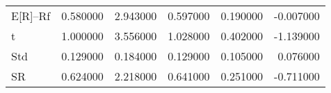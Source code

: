 \begin{tabular}{lrrrrr}
\toprule
\midrule
E[R]--Rf & 0.580000 & 2.943000 & 0.597000 & 0.190000 & -0.007000 \\
t & 1.000000 & 3.556000 & 1.028000 & 0.402000 & -1.139000 \\
Std & 0.129000 & 0.184000 & 0.129000 & 0.105000 & 0.076000 \\
SR & 0.624000 & 2.218000 & 0.641000 & 0.251000 & -0.711000 \\
\bottomrule
\end{tabular}
